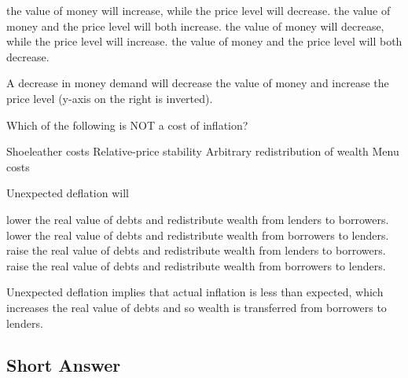 \documentclass[addpoints,11pt]{exam}
\theoremstyle{definition}
\begin{document}
\begin{questions}
\begin{choices}
	\choice the value of money will increase, while the price level will decrease.
	\choice the value of money and the price level will both increase.
	\CorrectChoice the value of money will decrease, while the price level will increase.
	\choice the value of money and the price level will both decrease.
\end{choices}

\begin{solution}
	A decrease in money demand will decrease the value of money and increase the price level (y-axis on the right is inverted).
\end{solution}

\newpage

\question Which of the following is NOT a cost of inflation?

\begin{choices}
	\choice Shoeleather costs
	\CorrectChoice Relative-price stability
	\choice Arbitrary redistribution of wealth
	\choice Menu costs
\end{choices}


\question Unexpected deflation will

\begin{choices}
	\choice lower the real value of debts and redistribute wealth from lenders to borrowers.
	\choice lower the real value of debts and redistribute wealth from borrowers to lenders.
	\choice raise the real value of debts and redistribute wealth from lenders to borrowers.
	\CorrectChoice raise the real value of debts and redistribute wealth from borrowers to lenders.
\end{choices}

\begin{solution}
	Unexpected deflation implies that actual inflation is less than expected, which increases the real value of debts and so wealth is transferred from borrowers to lenders.
\end{solution}
		
\end{questions}


\subsection*{Short Answer}
\end{document}
